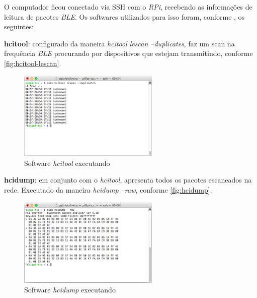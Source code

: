 \documentclass[
		12pt,				%
		openright,			%
		oneside,			%
		a4paper,			%
		chapter=TITLE,		%
		english,			%
		brazil				%
	]{abntex2}
\begin{document}
O computador ficou conectado via SSH com o \textit{RPi}, recebendo as informações de leitura de pacotes \textit{BLE}. Os softwares utilizados para isso foram, conforme , os seguintes:

\begin{alineas}
	\item \textbf{hcitool}: configurado da maneira \textit{hcitool lescan --duplicates}, faz um scan na frequência \textit{BLE} procurando por dispositivos que estejam transmitindo, conforme \autoref{fig:hcitool-lescan}.
	
	\begin{figure}[htb]
		\caption{\label{fig:hcitool-lescan}Software \textit{hcitool} executando}
		\begin{center}
			\includegraphics[width=0.6\textwidth]{img/hcitool-lescan.png}
		\end{center}
	\end{figure}

	\item \textbf{hcidump}: em conjunto com o \textit{hcitool}, apresenta todos os pacotes escaneados na rede. Executado da maneira \textit{hcidump --raw}, conforme \autoref{fig:hcidump}.
	
	\begin{figure}[htb]
		\caption{\label{fig:hcidump}Software \textit{hcidump} executando}
		\begin{center}
			\includegraphics[width=0.6\textwidth]{img/hcidump.png}
		\end{center}
	\end{figure}

\end{alineas}
\end{document}
